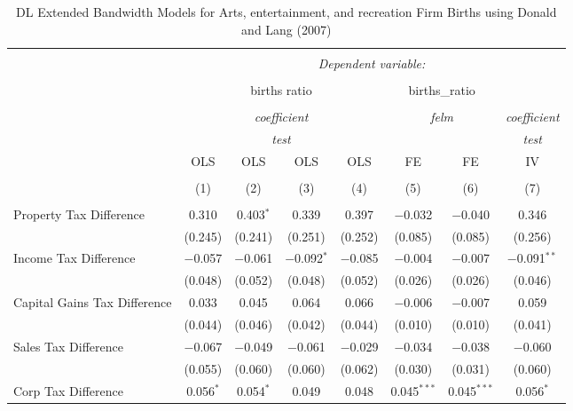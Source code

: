 
\begin{table}[!htbp] \centering 
  \caption{DL Extended Bandwidth Models for  Arts, entertainment, and recreation Firm Births using Donald and Lang (2007)} 
  \label{} 
\begin{tabular}{@{\extracolsep{5pt}}lccccccc} 
\\[-1.8ex]\hline 
\hline \\[-1.8ex] 
 & \multicolumn{7}{c}{\textit{Dependent variable:}} \\ 
\cline{2-8} 
\\[-1.8ex] & \multicolumn{4}{c}{births ratio} & \multicolumn{2}{c}{births\_ratio} &   \\ 
\\[-1.8ex] & \multicolumn{4}{c}{\textit{coefficient}} & \multicolumn{2}{c}{\textit{felm}} & \textit{coefficient} \\ 
 & \multicolumn{4}{c}{\textit{test}} & \multicolumn{2}{c}{\textit{}} & \textit{test} \\ 
 & OLS & OLS & OLS & OLS & FE & FE & IV \\ 
\\[-1.8ex] & (1) & (2) & (3) & (4) & (5) & (6) & (7)\\ 
\hline \\[-1.8ex] 
 Property Tax Difference & 0.310 & 0.403$^{*}$ & 0.339 & 0.397 & $-$0.032 & $-$0.040 & 0.346 \\ 
  & (0.245) & (0.241) & (0.251) & (0.252) & (0.085) & (0.085) & (0.256) \\ 
  Income Tax Difference & $-$0.057 & $-$0.061 & $-$0.092$^{*}$ & $-$0.085 & $-$0.004 & $-$0.007 & $-$0.091$^{**}$ \\ 
  & (0.048) & (0.052) & (0.048) & (0.052) & (0.026) & (0.026) & (0.046) \\ 
  Capital Gains Tax Difference & 0.033 & 0.045 & 0.064 & 0.066 & $-$0.006 & $-$0.007 & 0.059 \\ 
  & (0.044) & (0.046) & (0.042) & (0.044) & (0.010) & (0.010) & (0.041) \\ 
  Sales Tax Difference & $-$0.067 & $-$0.049 & $-$0.061 & $-$0.029 & $-$0.034 & $-$0.038 & $-$0.060 \\ 
  & (0.055) & (0.060) & (0.060) & (0.062) & (0.030) & (0.031) & (0.060) \\ 
  Corp Tax Difference & 0.056$^{*}$ & 0.054$^{*}$ & 0.049 & 0.048 & 0.045$^{***}$ & 0.045$^{***}$ & 0.056$^{*}$ \\ 

\end{tabular}
\end{table}
